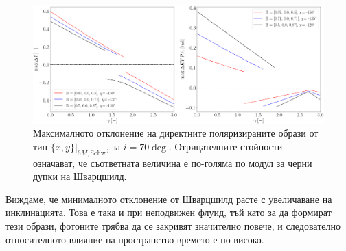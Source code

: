 \begin{figure}[!htb]
	\centering
	\includegraphics[scale = 0.22]{WH_70_deg_param_sweep.png}
	\caption[Максималното отклонение на директните поляризираните образи от тип $\{x,y\}\vert_{6M, \text{Schw}}$, за $i = 70\deg$]{Максималното отклонение на директните поляризираните образи от тип $\{x,y\}\vert_{6M, \text{Schw}}$, за $i = 70\deg$. Отрицателните стойности означават, че съответната величина е по-голяма по модул за черни дупки на Шварцшилд.} 
	\label{WH_max_deviation_70_deg}
\end{figure}

Виждаме, че минималното отклонение от Шварцшилд расте с увеличаване на инклинацията. Това е така и при неподвижен флуид, тъй като за да формират тези образи, фотоните трябва да се закривят значително повече, и следователно относителното влияние на пространство-времето е по-високо.

